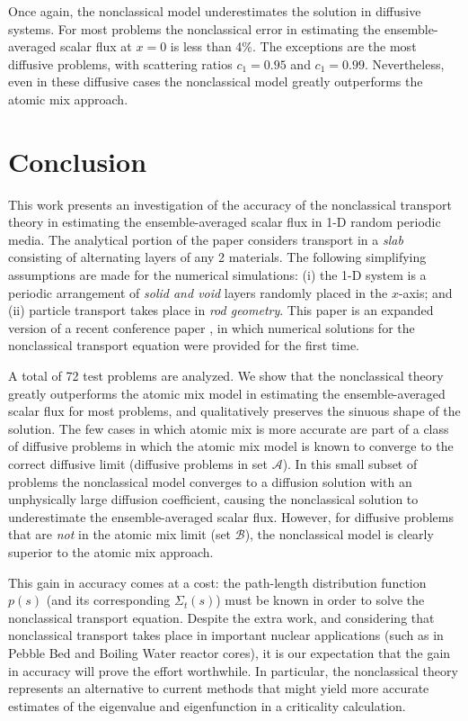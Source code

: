 \documentclass[12pt]{article}
\newcommand{\seta}{\mathcal{A}}
\newcommand{\setb}{\mathcal{B}}
\begin{document}
{Once again, the nonclassical model underestimates the solution in diffusive systems. For most problems the nonclassical error in estimating the ensemble-averaged scalar flux at $x=0$ is less than 4\%. The exceptions are the most diffusive problems, with scattering ratios $c_1 = 0.95$ and $c_1 = 0.99$. Nevertheless, even in these diffusive cases the nonclassical model greatly outperforms the atomic mix approach.

\section{Conclusion}\label{sec6}

This work presents an investigation of the accuracy of the nonclassical transport theory in estimating the ensemble-averaged scalar flux in 1-D random periodic media. The analytical portion of the paper considers transport in a {\em slab} consisting of alternating layers of any 2 materials. The following simplifying assumptions are made for the numerical simulations: (i) the 1-D system is a periodic arrangement of {\em solid and void} layers randomly placed in the $x$-axis; and (ii) particle transport takes place in {\em rod geometry}. This paper is an expanded version of a recent conference paper \cite{mc15}, in which numerical solutions for the nonclassical transport equation were provided for the first time. 

A total of 72 test problems are analyzed. We show that the nonclassical theory greatly outperforms the atomic mix model in estimating the ensemble-averaged scalar flux for most problems, and qualitatively
preserves the sinuous shape of the solution. The few cases in which atomic mix is more accurate are part of a class of diffusive problems in which the atomic mix model is known to converge to the correct diffusive limit (diffusive problems in set $\seta$). In this small subset of problems the nonclassical model converges to a diffusion solution with an unphysically large diffusion coefficient, causing the nonclassical solution to underestimate the ensemble-averaged scalar flux. However, for diffusive problems that are {\em not} in the atomic mix limit (set $\setb$), the nonclassical model is clearly superior to the atomic mix approach.

This gain in accuracy comes at a cost: the path-length distribution function $p(s)$ (and its
corresponding $\Sigma_t(s)$) must be known in order to solve the nonclassical transport equation. Despite the extra work, and considering that nonclassical transport takes place in important nuclear applications (such as in
Pebble Bed and Boiling Water reactor cores), it is our expectation that the gain in accuracy will prove the effort worthwhile. In particular, the nonclassical theory represents an alternative to current methods that might yield more accurate estimates of the eigenvalue and eigenfunction in a criticality calculation.

}
\end{document}
